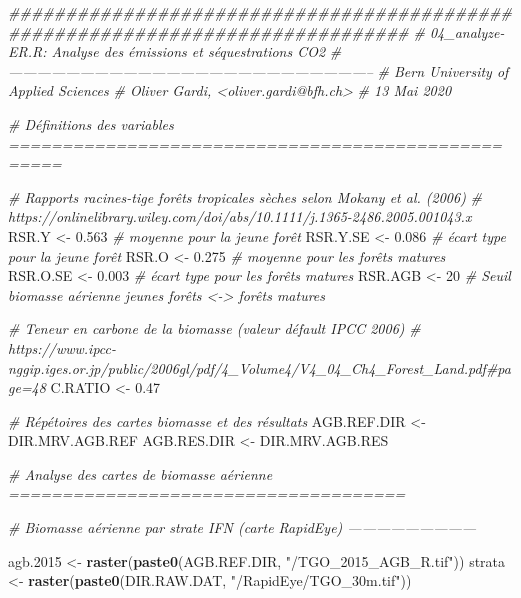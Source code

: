 \documentclass[a4paper, notitlepage, 12pt, krantz2]{krantz}
\newenvironment{Shaded}{\begin{snugshade}}{\end{snugshade}}
\newcommand{\CommentTok}[1]{\textcolor[rgb]{0.56,0.35,0.01}{\textit{#1}}}
\newcommand{\DecValTok}[1]{\textcolor[rgb]{0.00,0.00,0.81}{#1}}
\newcommand{\FloatTok}[1]{\textcolor[rgb]{0.00,0.00,0.81}{#1}}
\newcommand{\KeywordTok}[1]{\textcolor[rgb]{0.13,0.29,0.53}{\textbf{#1}}}
\newcommand{\NormalTok}[1]{#1}
\newcommand{\StringTok}[1]{\textcolor[rgb]{0.31,0.60,0.02}{#1}}
\begin{document}
\begin{Shaded}
\begin{Highlighting}[]
\CommentTok{###############################################################################}
\CommentTok{# 04_analyze-ER.R: Analyse des émissions et séquestrations CO2}
\CommentTok{# -----------------------------------------------------------------------------}
\CommentTok{# Bern University of Applied Sciences}
\CommentTok{# Oliver Gardi, <oliver.gardi@bfh.ch>}
\CommentTok{# 13 Mai 2020}

\CommentTok{# Définitions des variables ===================================================}

\CommentTok{# Rapports racines-tige forêts tropicales sèches selon Mokany et al. (2006)}
\CommentTok{# https://onlinelibrary.wiley.com/doi/abs/10.1111/j.1365-2486.2005.001043.x}
\NormalTok{RSR.Y    <-}\StringTok{ }\FloatTok{0.563}     \CommentTok{# moyenne pour la jeune forêt      }
\NormalTok{RSR.Y.SE <-}\StringTok{ }\FloatTok{0.086}     \CommentTok{# écart type pour la jeune forêt  }
\NormalTok{RSR.O    <-}\StringTok{ }\FloatTok{0.275}     \CommentTok{# moyenne pour les forêts matures }
\NormalTok{RSR.O.SE <-}\StringTok{ }\FloatTok{0.003}     \CommentTok{# écart type pour les forêts matures}
\NormalTok{RSR.AGB  <-}\StringTok{ }\DecValTok{20}        \CommentTok{# Seuil biomasse aérienne jeunes forêts <-> forêts matures}

\CommentTok{# Teneur en carbone de la biomasse (valeur défault IPCC 2006)}
\CommentTok{# https://www.ipcc-nggip.iges.or.jp/public/2006gl/pdf/4_Volume4/V4_04_Ch4_Forest_Land.pdf#page=48}
\NormalTok{C.RATIO  <-}\StringTok{ }\FloatTok{0.47}

\CommentTok{# Répétoires des cartes biomasse et des résultats}
\NormalTok{AGB.REF.DIR <-}\StringTok{ }\NormalTok{DIR.MRV.AGB.REF}
\NormalTok{AGB.RES.DIR <-}\StringTok{ }\NormalTok{DIR.MRV.AGB.RES}



\CommentTok{# Analyse des cartes de biomasse aérienne =====================================}

\CommentTok{# Biomasse aérienne par strate IFN (carte RapidEye) ---------------------------}

\NormalTok{agb}\FloatTok{.2015}\NormalTok{ <-}\StringTok{ }\KeywordTok{raster}\NormalTok{(}\KeywordTok{paste0}\NormalTok{(AGB.REF.DIR, }\StringTok{"/TGO_2015_AGB_R.tif"}\NormalTok{))}
\NormalTok{strata  <-}\StringTok{ }\KeywordTok{raster}\NormalTok{(}\KeywordTok{paste0}\NormalTok{(DIR.RAW.DAT, }\StringTok{"/RapidEye/TGO_30m.tif"}\NormalTok{))}


\end{Highlighting}
\end{Shaded}
\end{document}
